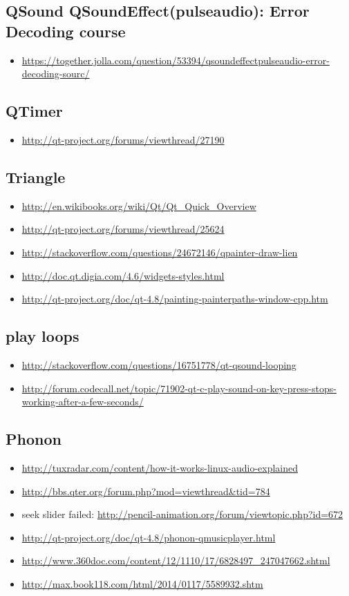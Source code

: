 \documentclass[9pt,b5paper]{article}
\begin{document}
\subsection{QSound QSoundEffect(pulseaudio): Error Decoding course}
\label{sec-18-17}
\begin{itemize}
\item \url{https://together.jolla.com/question/53394/qsoundeffectpulseaudio-error-decoding-sourc/}
\end{itemize}
\subsection{QTimer}
\label{sec-18-18}
\begin{itemize}
\item \url{http://qt-project.org/forums/viewthread/27190}
\end{itemize}
\subsection{Triangle}
\label{sec-18-19}
\begin{itemize}
\item \url{http://en.wikibooks.org/wiki/Qt/Qt_Quick_Overview}
\item \url{http://qt-project.org/forums/viewthread/25624}
\item \url{http://stackoverflow.com/questions/24672146/qpainter-draw-lien}
\item \url{http://doc.qt.digia.com/4.6/widgets-styles.html}
\item \url{http://qt-project.org/doc/qt-4.8/painting-painterpaths-window-cpp.htm}
\end{itemize}
\subsection{play loops}
\label{sec-18-20}
\begin{itemize}
\item \url{http://stackoverflow.com/questions/16751778/qt-qsound-looping}
\item \url{http://forum.codecall.net/topic/71902-qt-c-play-sound-on-key-press-stops-working-after-a-few-seconds/}
\end{itemize}
\subsection{Phonon}
\label{sec-18-21}
\begin{itemize}
\item \url{http://tuxradar.com/content/how-it-works-linux-audio-explained}
\item \url{http://bbs.qter.org/forum.php?mod=viewthread&tid=784}
\item seek slider failed: \url{http://pencil-animation.org/forum/viewtopic.php?id=672}
\item \url{http://qt-project.org/doc/qt-4.8/phonon-qmusicplayer.html}
\item \url{http://www.360doc.com/content/12/1110/17/6828497_247047662.shtml}
\item \url{http://max.book118.com/html/2014/0117/5589932.shtm}
\end{itemize}
\end{document}
